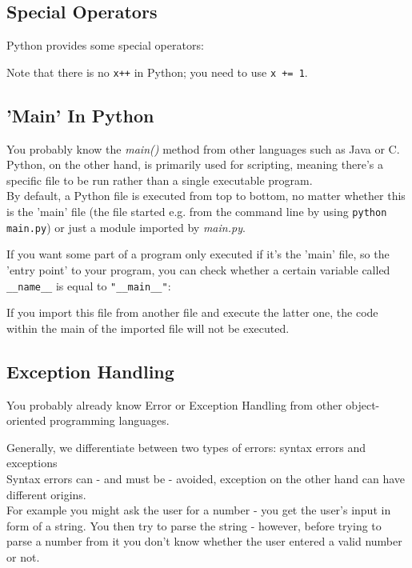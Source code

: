     \subsection{Special Operators}
        Python provides some special operators:


        Note that there is no \texttt{x++} in Python; you need to use
        \texttt{x += 1}.

    \subsection{'Main' In Python}
        You probably know the \textit{main()} method from other languages such as Java or C. \\
        Python, on the other hand, is primarily used for scripting, meaning there's a specific file
        to be run rather than a single executable program. \\
        By default, a Python file is executed from top to bottom, no matter whether this is the
        'main' file (the file started e.g. from the command line by using
        \texttt{python main.py}) or just a module imported by \textit{main.py}.

        If you want some part of a program only executed if it's the 'main' file, so the
        'entry point' to your program, you can check whether a certain variable called
        \texttt{__name__} is equal to \texttt{"__main__"}:


        If you import this file from another file and execute the latter one, the code within the
        main of the imported file will not be executed.


    \subsection{Exception Handling}
        You probably already know Error or Exception Handling from other object-oriented
        programming languages.

        Generally, we differentiate between two types of errors: syntax errors and exceptions \\
        Syntax errors can - and must be - avoided, exception on the other hand can have different
        origins. \\
        For example you might ask the user for a number - you get the user's input in form
        of a string. You then try to parse the string - however, before trying to parse a number
        from it you don't know whether the user entered a valid number or not.

